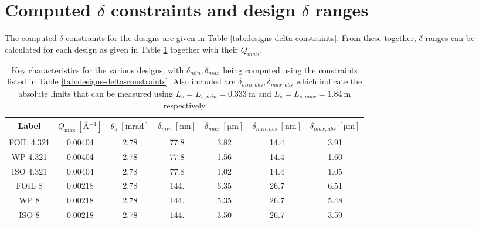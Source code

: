\section{Computed $\delta$ constraints and design $\delta$ ranges}
\label{c4.2}
The computed $\delta$-constraints for the designs are given in Table \ref{tab:designs-delta-constraints}. From these together, $\delta$-ranges can be calculated for each design as given in Table \ref{tab:designs-final-ranges} together with their $Q_{max}$.
\begin{table}[h!]
	\centering
	\begin{tabular}{c | c c c c | cc}
		\toprule
		Label & $Q_{\text{max}} ~[\unit{\angstrom^{-1}}]$ & $\theta_a~[\unit{\milli\radian}]$ & $\delta_{min}~[\unit{\nano\meter}]$ & $\delta_{max}~[\unit{\micro\meter}]$ & $\delta_{min,abs}~[\unit{\nano\meter}]$ & $\delta_{max,abs}~[\unit{\micro\meter}]$ \\
		\midrule
FOIL 4.321 & \num{0.00404} & \num{2.78} & \num{77.8} & \num{3.82} & \num{14.4} & \num{3.91} \\
WP 4.321 & \num{0.00404} & \num{2.78} & \num{77.8} & \num{1.56} & \num{14.4} & \num{1.60} \\
ISO 4.321 & \num{0.00404} & \num{2.78} & \num{77.8} & \num{1.02} & \num{14.4} & \num{1.05} \\
FOIL 8 & \num{0.00218} & \num{2.78} & \num{144.} & \num{6.35} & \num{26.7} & \num{6.51} \\
WP 8 & \num{0.00218} & \num{2.78} & \num{144.} & \num{5.35} & \num{26.7} & \num{5.48} \\
ISO 8 & \num{0.00218} & \num{2.78} & \num{144.} & \num{3.50} & \num{26.7} & \num{3.59} \\
		\bottomrule
	\end{tabular}
	\caption{Key characteristics for the various designs, with $\delta_{min}, \delta_{max}$ being computed using the constraints listed in Table \ref{tab:designs-delta-constraints}. Also included are $\delta_{min,abs}, \delta_{max,abs}$ which indicate the absolute limits that can be measured using $L_s = L_{s,min} = \SI{0.333}{\meter}$ and $L_s = L_{s,max} = \SI{1.84}{\meter}$ respectively}
	\label{tab:designs-final-ranges}
\end{table}
